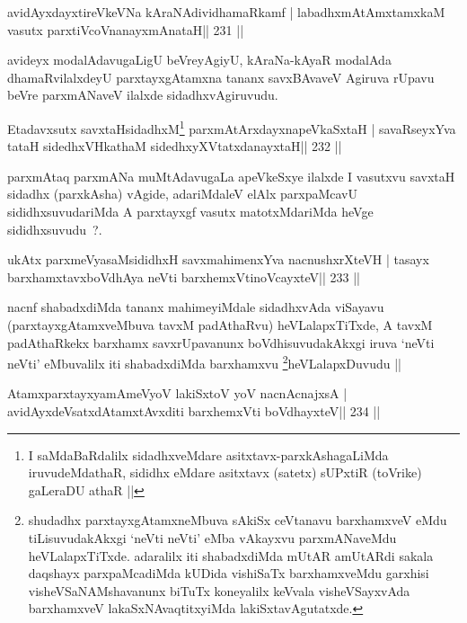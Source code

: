 \begin{shl}
avidAyxdayxtireVkeVNa kAraNAdividhamaRkamf |
labadhxmAtAmxtamxkaM vasutx parxtiVcoV\s nanayxmAnataH\hfill || 231 ||
\end{shl}

\begin{artha}
avideyx modalAdavugaLigU beVreyAgiyU, kAraNa-kAyaR modalAda dhamaRvilalxdeyU parxtayxgAtamxna tananx savxBAvaveV Agiruva rUpavu beVre parxmANaveV ilalxde sidadhxvAgiruvudu.
\end{artha}

\begin{shl}
Etadavxsutx savxtaHsidadhxM\footnote{I saMdaBaRdalilx sidadhxveMdare
  asitxtavx-parxkAshagaLiMda iruvudeMdathaR, sididhx eMdare asitxtavx
  (satetx) sUPxtiR (toVrike) gaLeraDU athaR ||} parxmAtArxdayxnapeVkaSxtaH |
savaRseyxYva tataH sidedhxVH\footnotemark[\value{footnote}] kathaM sidedhxyXVtatxdanayxtaH\hfill || 232 ||
\end{shl}

\begin{artha}
parxmAtaq parxmANa muMtAdavugaLa apeVkeSxye ilalxde I vasutxvu savxtaH sidadhx (parxkAsha) vAgide, adariMdaleV elAlx parxpaMcavU sididhxsuvudariMda A parxtayxgf vasutx matotxMdariMda heVge sididhxsuvudu~?.
\end{artha}

\begin{shl}
ukAtx parxmeVyasaMsididhxH savxmahimenxYva nacnushxrXteVH |
tasayx barxhamxtavxboVdhAya neVti barxhemxVtinoVcayxteV\hfill || 233 ||
\end{shl}

\begin{artha}
nacnf shabadxdiMda tananx mahimeyiMdale sidadhxvAda viSayavu
(parxtayxgAtamxveMbuva tavxM padAthaRvu) heVLalapxTiTxde, A
tavxM padAthaRkekx barxhamx savxrUpavanunx boVdhisuvudakAkxgi iruva
`neVti neVti' eMbuvalilx iti shabadxdiMda
barxhamxvu \footnote{shudadhx parxtayxgAtamxneMbuva sAkiSx
  ceVtanavu barxhamxveV eMdu tiLisuvudakAkxgi `neVti neVti' eMba
  vAkayxvu parxmANaveMdu heVLalapxTiTxde. adaralilx iti shabadxdiMda
  mUtAR amUtARdi sakala daqshayx parxpaMcadiMda kUDida vishiSaTx
  barxhamxveMdu garxhisi visheVSaNAMshavanunx biTuTx koneyalilx
  keVvala visheVSayxvAda barxhamxveV lakaSxNAvaqtitxyiMda lakiSxtavAgutatxde.}heVLalapxDuvudu ||
\end{artha}

\begin{shl}
AtamxparxtayxyamAmeVyoV lakiSxtoV yoV nacnA\s cnajxsA |
avidAyxdeVsatxdAtamxtAvxditi barxhemxVti boVdhayxteV\hfill || 234 ||
\end{shl}

